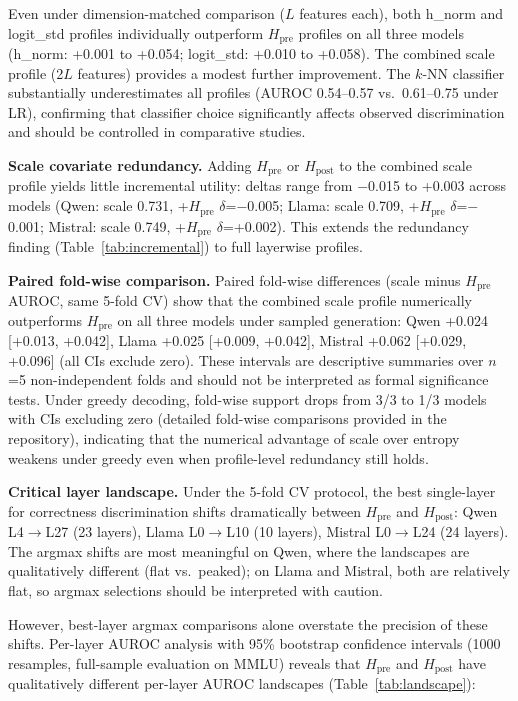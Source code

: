 \documentclass{ieeeaccess}
\newcommand{\Hpre}{H_{\text{pre}}}
\newcommand{\Hpost}{H_{\text{post}}}
\begin{document}
Even under dimension-matched comparison ($L$ features each), both h\_norm and logit\_std profiles individually outperform $\Hpre$ profiles on all three models (h\_norm: +0.001 to +0.054; logit\_std: +0.010 to +0.058). The combined scale profile (2$L$ features) provides a modest further improvement. The $k$-NN classifier substantially underestimates all profiles (AUROC 0.54--0.57 vs.\ 0.61--0.75 under LR), confirming that classifier choice significantly affects observed discrimination and should be controlled in comparative studies.

\textbf{Scale covariate redundancy.} Adding $\Hpre$ or $\Hpost$ to the combined scale profile yields little incremental utility: deltas range from $-$0.015 to +0.003 across models (Qwen: scale 0.731, +$\Hpre$ $\delta$=$-$0.005; Llama: scale 0.709, +$\Hpre$ $\delta$=$-$0.001; Mistral: scale 0.749, +$\Hpre$ $\delta$=+0.002). This extends the redundancy finding (Table~\ref{tab:incremental}) to full layerwise profiles.

\textbf{Paired fold-wise comparison.} Paired fold-wise differences (scale minus $\Hpre$ AUROC, same 5-fold CV) show that the combined scale profile numerically outperforms $\Hpre$ on all three models under sampled generation: Qwen +0.024 [+0.013, +0.042], Llama +0.025 [+0.009, +0.042], Mistral +0.062 [+0.029, +0.096] (all CIs exclude zero). These intervals are descriptive summaries over $n$=5 non-independent folds and should not be interpreted as formal significance tests. Under greedy decoding, fold-wise support drops from 3/3 to 1/3 models with CIs excluding zero (detailed fold-wise comparisons provided in the repository), indicating that the numerical advantage of scale over entropy weakens under greedy even when profile-level redundancy still holds.

\textbf{Critical layer landscape.} Under the 5-fold CV protocol, the best single-layer for correctness discrimination shifts dramatically between $\Hpre$ and $\Hpost$: Qwen L4$\to$L27 (23 layers), Llama L0$\to$L10 (10 layers), Mistral L0$\to$L24 (24 layers). The argmax shifts are most meaningful on Qwen, where the landscapes are qualitatively different (flat vs.\ peaked); on Llama and Mistral, both are relatively flat, so argmax selections should be interpreted with caution.

However, best-layer argmax comparisons alone overstate the precision of these shifts. Per-layer AUROC analysis with 95\% bootstrap confidence intervals (1000 resamples, full-sample evaluation on MMLU) reveals that $\Hpre$ and $\Hpost$ have qualitatively different per-layer AUROC landscapes (Table~\ref{tab:landscape}):
\end{document}
